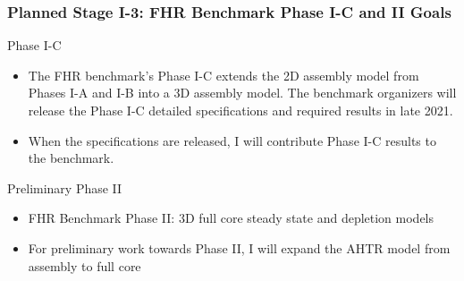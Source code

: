 \begin{frame}
    \frametitle{Planned Stage I-3: FHR Benchmark Phase I-C and II Goals}
    \begin{block}{Phase I-C}
        \begin{itemize}
            \item The FHR benchmark's Phase I-C extends the 2D assembly model from 
            Phases I-A and I-B into a 3D assembly model. The benchmark organizers 
            will release the Phase I-C detailed specifications and required results 
            in late 2021.
            \item When the specifications are released, I will contribute Phase I-C
            results to the benchmark. 
        \end{itemize}
    \end{block}
    \begin{block}{Preliminary Phase II}
        \begin{itemize}
            \item FHR Benchmark Phase II: 3D full core steady state and depletion 
            models 
            \item For preliminary work towards Phase II, I will expand the AHTR model 
            from assembly to full core 
        \end{itemize}
    \end{block}
\end{frame}